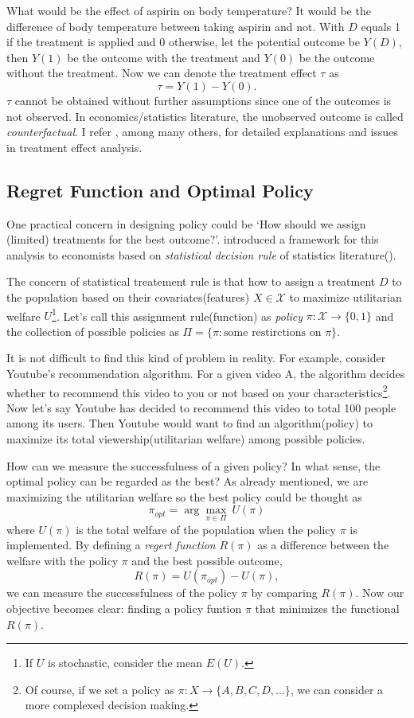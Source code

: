 \documentclass[11pt]{article}
\begin{document}
	What would be the effect of aspirin on body temperature? It would be the difference of body temperature between taking aspirin and not. With $D$ equals 1 if the treatment is applied and 0 otherwise, let the potential outcome be $Y(D)$, then $Y(1)$ be the outcome with the treatment and $Y(0)$ be the outcome without the treatment. Now we can denote the treatment effect $\tau$ as
	$$
	\tau = Y(1) - Y(0).
	$$
	$\tau$ cannot be obtained without further assumptions since one of the outcomes is not observed. In economics/statistics literature, the unobserved outcome is called \textit{counterfactual}. I refer \cite{imbens2015causal}, among many others,  for detailed explanations and issues in treatment effect analysis.
	
	\subsection*{Regret Function and Optimal Policy}
	One practical concern in designing policy could be `How should we assign (limited) treatments for the best outcome?'.
	 \cite{Manski.2004} introduced a framework for this analysis to economists based on \textit{statistical decision rule} of statistics literature(\cite{wald1950statistical}). 
	 
	 The concern of statistical treatement rule is that how to assign a treatment $D$ to the population based on their covariates(features) $X \in \mathcal{X}$ to maximize utilitarian welfare $U$\footnote{If $U$ is stochastic, consider the mean $E(U)$.}. Let's call this assignment rule(function) as \textit{policy} $\pi:\mathcal{X} \rightarrow \{0,1\}$ and the collection of possible policies as $\Pi=\{\pi: \text{some restirctions on } \pi\}$.
	 
	 It is not difficult to find this kind of problem in reality. For example, consider Youtube's recommendation algorithm. For a given video A, the algorithm decides whether to recommend this video to you or not based on your characteristics\footnote{Of course, if we set a policy as $\pi:X \rightarrow \{A,B,C,D,...\}$, we can consider a more complexed decision making.}. Now let's say Youtube has decided to  recommend this video to total 100 people among its users. Then Youtube would want to find an algorithm(policy) to maximize its total viewership(utilitarian welfare) among possible policies.
	 
	 How can we measure the successfulness of a given policy? In what sense, the optimal policy can be regarded as the best? As already mentioned, we are maximizing the utilitarian welfare so the best policy could be thought as
	 $$
	 \pi_{opt} = \arg \max_{\pi \in \Pi} ~U(\pi)
	 $$
	 where $U(\pi)$ is the total welfare of the population when the policy $\pi$ is implemented. By defining a \textit{regert function} $R(\pi)$ as a difference between the welfare with the policy $\pi$ and the best possible outcome,
	 $$
	 R(\pi) = U(\pi_{opt}) - U(\pi),
	 $$
	 we can measure the successfulness of the policy $\pi$ by comparing $R(\pi)$. Now our objective becomes clear: finding a policy funtion $\pi$ that minimizes the functional $R(\pi)$.
	 
\end{document}
